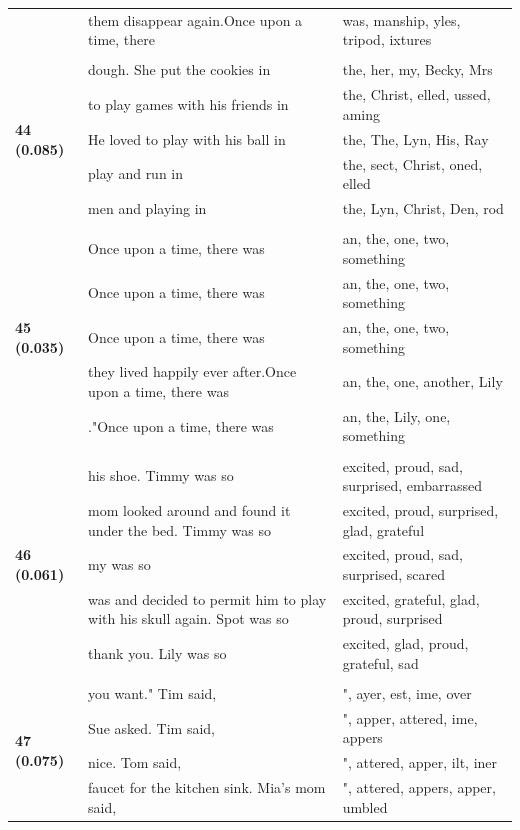\documentclass{article}
\theoremstyle{plain}
\theoremstyle{definition}
\theoremstyle{remark}
\begin{document}
\begin{longtable}{|p{}|p{}|p{}|}
& them disappear again.Once upon a time, there & was, manship, yles,  tripod, ixtures \\
& & \\
\multirow{5}{*}{\textbf{44 (0.085)}} & dough. She put the cookies in & the,  her,  my,  Becky,  Mrs \\
& to play games with his friends in & the, Christ, elled, ussed, aming \\
& He loved to play with his ball in & the, The,  Lyn, His, Ray \\
& play and run in & the, sect, Christ, oned, elled \\
& men and playing in & the,  Lyn, Christ, Den, rod \\
& & \\
\multirow{5}{*}{\textbf{45 (0.035)}} & Once upon a time, there was & an,  the,  one,  two,  something \\
& Once upon a time, there was & an,  the,  one,  two,  something \\
& Once upon a time, there was & an,  the,  one,  two,  something \\
& they lived happily ever after.Once upon a time, there was & an,  the,  one,  another,  Lily \\
& ."Once upon a time, there was & an,  the,  Lily,  one,  something \\
& & \\
\multirow{5}{*}{\textbf{46 (0.061)}} & his shoe. Timmy was so & excited,  proud,  sad,  surprised,  embarrassed \\
& mom looked around and found it under the bed. Timmy was so & excited,  proud,  surprised,  glad,  grateful \\
& my was so & excited,  proud,  sad,  surprised,  scared \\
& was and decided to permit him to play with his skull again. Spot was so & excited,  grateful,  glad,  proud,  surprised \\
& thank you. Lily was so & excited,  glad,  proud,  grateful,  sad \\
& & \\
\multirow{5}{*}{\textbf{47 (0.075)}} & you want." Tim said, & ", ayer, est, ime, over \\
& Sue asked. Tim said, & ", apper, attered, ime, appers \\
& nice. Tom said, & ", attered, apper, ilt, iner \\
& faucet for the kitchen sink. Mia's mom said, & ", attered, appers, apper, umbled \\

\end{longtable}
\end{document}
